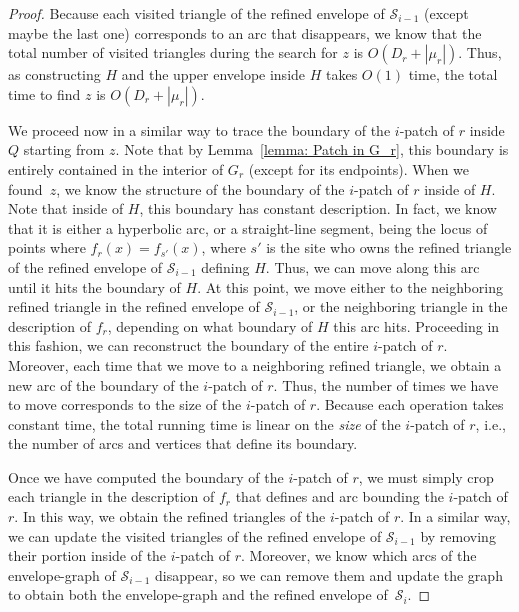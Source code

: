 \documentclass[a4paper,UKenglish]{socg-lipics-v2018}
\newcommand{\icell}[1][i]{${#1}$-patch\xspace}
\newcommand{\s}{\mathcal S}
\begin{document}
{\begin{proof}
Because each visited triangle of the refined envelope of $\s_{i-1}$ (except maybe the last one) corresponds to an arc that disappears, we know that the total number of visited triangles during the search for $z$ is $O(D_r + |\mu_r|)$.
Thus, as constructing $H$ and the upper envelope inside $H$ takes $O(1)$ time, the total time to find $z$ is $O(D_r + |\mu_r|)$.

We proceed now in a similar way to trace the boundary of the \icell of $r$ inside $Q$ starting from $z$.
Note that by Lemma~\ref{lemma: Patch in G_r}, this boundary is entirely contained in the interior of $G_r$ (except for its endpoints). 
When we found~$z$, we know the structure of the boundary of the \icell of $r$ inside of $H$. 
Note that inside of $H$, this boundary has constant description. 
In fact, we know that it is either a hyperbolic arc, or a straight-line segment, being the locus of points where $f_r(x) = f_{s'}(x)$, where $s'$ is the site who owns the refined triangle of the refined envelope of $\s_{i-1}$ defining $H$.
Thus, we can move along this arc until it hits the boundary of $H$. 
At this point, we move either to the neighboring refined triangle in the refined envelope of $\s_{i-1}$, 
or the neighboring triangle in the description of $f_r$,  
depending on what boundary of $H$ this arc hits. 
Proceeding in this fashion, we can reconstruct the boundary of the entire \icell of $r$. 
Moreover, each time that we move to a neighboring refined triangle, we obtain a new arc of the boundary of the \icell of $r$. 
Thus, the number of times we have to move corresponds to the size of the \icell of $r$. 
Because each operation takes constant time, the total running time is linear on the \emph{size} of the \icell of $r$, i.e., the number of arcs and vertices that define its boundary.

Once we have computed the boundary of the \icell of $r$, we must simply crop each triangle in the description of $f_r$ that defines and arc bounding the \icell of $r$. 
In this way, we obtain the refined triangles of the \icell of $r$.
In a similar way, we can update the visited triangles of the refined envelope of $\s_{i-1}$ by removing their portion inside of the \icell of $r$.
Moreover, we know which arcs of the envelope-graph of $\s_{i-1}$ disappear, so we can remove them and update the graph to obtain both the envelope-graph and the refined envelope of~$\s_i$. 
\end{proof}
}
\end{document}
